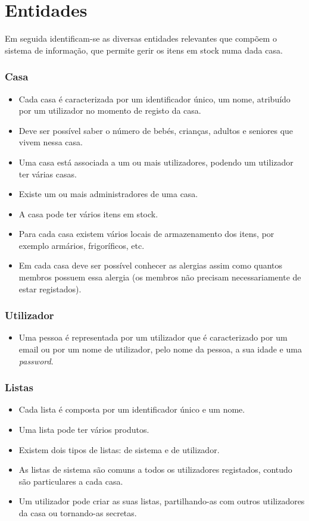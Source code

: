 
%
%
\section{Entidades} \label{sec24}

Em seguida identificam-se as diversas entidades relevantes que compõem o sistema de informação, que permite gerir os itens em stock numa dada casa.
\subsubsection{Casa}
\begin{itemize}
	\item Cada casa é caracterizada por um identificador único, um nome, atribuído por um utilizador no momento de registo da casa. 
	\item Deve ser possível saber o número de bebés, crianças, adultos e seniores que vivem nessa casa.
	\item Uma casa está associada a um ou mais utilizadores, podendo um utilizador ter várias casas. 
	\item Existe um ou mais administradores de uma casa.
	\item A casa pode ter vários itens em stock.
	\item Para cada casa existem vários locais de armazenamento dos itens, por exemplo armários, frigoríficos, etc.
	\item Em cada casa deve ser possível conhecer as alergias assim como quantos membros possuem essa alergia (os membros não precisam necessariamente de estar registados).
\end{itemize}

\subsubsection{Utilizador}
\begin{itemize}
	\item Uma pessoa é representada por um utilizador que é caracterizado por um email ou por um nome de utilizador, pelo nome da pessoa, a sua idade e uma \textit{password}.
\end{itemize}

\subsubsection{Listas}
\begin{itemize}
	\item Cada lista é composta por um identificador único e um nome.
	\item Uma lista pode ter vários produtos.
	\item Existem dois tipos de listas: de sistema e de utilizador. 
	\item As listas de sistema são comuns a todos os utilizadores registados, contudo são particulares a cada casa.	
	\item Um utilizador pode criar as suas listas, partilhando-as com outros utilizadores da casa ou tornando-as secretas.
\end{itemize}

